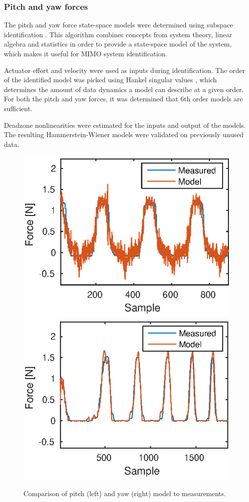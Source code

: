 \subsubsection{Pitch and yaw forces}
The pitch and yaw force state-space models were determined using subspace identification  \cite{van2012subspace}. This algorithm combines concepts from system theory, linear algebra and statistics in order to provide a state-space model of the system, which makes it useful for MIMO system identification. 

Actuator effort and velocity were used as inputs during identification.
The order of the identified model was picked using Hankel singular values \cite{gawronski1990model}, which determines the amount of data dynamics a model can describe at a given order. For both the pitch and yaw forces, it was determined that 6th order models are sufficient. 

Deadzone nonlinearities were estimated for the inputs and output of the models. 
The resulting Hammerstein-Wiener models were validated on previously unused data.

 \begin{figure}[h]
 \centering
 \includegraphics[width=0.49\linewidth]{modelpitch2_a}
 \includegraphics[width=0.49\linewidth]{modelyaw_a}
 \caption{Comparison of pitch (left) and yaw (right) model to measurements.}
 \label{fig:final_res_yaw}
 \end{figure}



